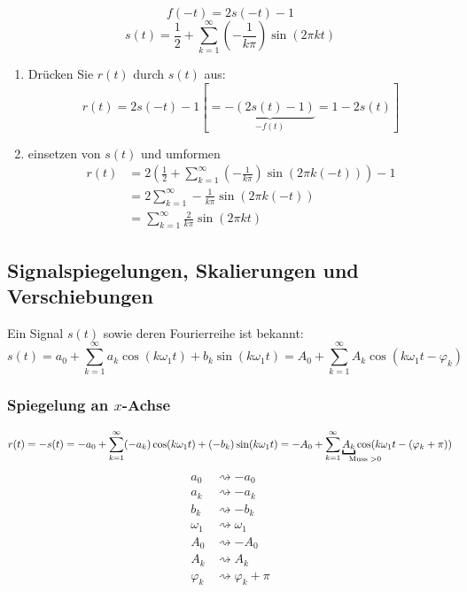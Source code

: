 
\[
f(-t) = 2s(-t) -1
\]
\[
s(t) = \frac{1}{2} + \sum^\infty_{k=1} \left(-\frac{1}{k\pi}\right) \sin(2\pi k t)
\]

\begin{enumerate}
	\item Drücken Sie $r(t)$ durch $s(t)$ aus: \[
		r(t) = 2s(-t) -1 \left[ = \underbrace{-(2s(t) -1)}_{-f(t)} = 1 - 2s(t) \right]
		\]
	\item einsetzen von $s(t)$ und umformen \begin{align*}
		r(t) &= 2 \left( \frac{1}{2} + \sum^\infty_{k=1} \left(-\frac{1}{k\pi}\right) \sin(2\pi k (-t))\right) -1 \\
		&= 2 \sum^\infty_{k=1} - \frac{1}{k\pi} \sin(2\pi k (-t))\\
		&= \sum^\infty_{k=1} \frac{2}{k\pi} \sin(2 \pi k t)
	\end{align*}
\end{enumerate}

\subsection{Signalspiegelungen, Skalierungen und Verschiebungen}

Ein Signal $s(t)$ sowie deren Fourierreihe ist bekannt: \[
	s(t) = a_0 + \sum^\infty_{k=1} a_k \cos(k \omega_1 t) + b_k \sin(k \omega_1 t) = A_0 + \sum^\infty_{k=1} A_k \cos( k \omega_1 t - \varphi_k)
\]

\subsubsection{Spiegelung an $x$-Achse}
\[
	r(t) = -s(t) = -a_0 + \sum^\infty_{k=1} (-a_k) \cos(k \omega_1 t) + (-b_k) \sin(k \omega_1 t) = -A_0 + \sum^\infty_{k=1} \underbracket{A_k}_{\mathrlap{\text{Muss } >0}} \cos(k \omega_1 t - (\varphi_k + \pi))
\] \begin{align*}
	a_0 &\rightsquigarrow -a_0 \\
	a_k &\rightsquigarrow -a_k \\
	b_k &\rightsquigarrow -b_k \\
	\omega_1 &\rightsquigarrow \omega_1 \\
	A_0 &\rightsquigarrow -A_0 \\
	A_k &\rightsquigarrow A_k \\
	\varphi_k &\rightsquigarrow \varphi_k + \pi
\end{align*}

